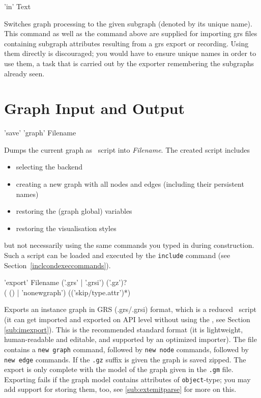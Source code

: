 \begin{rail}
  'in' Text
\end{rail}
Switches graph processing to the given subgraph (denoted by its unique name).
This command as well as the command above are supplied for importing grs files containing subgraph attributes resulting from a grs export or recording.
Using them directly is discouraged; you would have to ensure unique names in order to use them, a task that is carried out by the exporter remembering the subgraphs already seen.


\section{Graph Input and Output}
\label{outputcmds}

\begin{rail}
  'save' 'graph' Filename
\end{rail}
Dumps the current graph as \GrShell\ script into \emph{Filename}.
The created script includes
\begin{itemize}
  \item selecting the backend
  \item creating a new graph with all nodes and edges (including their persistent names)
  \item restoring the (graph global) variables
  \item restoring the visualisation styles
\end{itemize}
but not necessarily using the same commands you typed in during construction.
Such a script can be loaded and executed by the \texttt{include} command (see Section~\ref{inclcondexeccommands}).

\begin{rail}
  'export' Filename ('.grs' | '.grsi') ('.gz')? \\ ( () | 'nonewgraph') (('skip/type.attr')*)
\end{rail}
Exports an instance graph in GRS (.grs/.grsi) format, which is a reduced \GrShell\ script
(it can get imported and exported on API level without using the \GrShell, see Section \ref{sub:imexport}).
This is the recommended standard format (it is lightweight, human-readable and editable, and supported by an optimized importer).
The file contains a \texttt{new graph} command, followed by \texttt{new node} commands, followed by \texttt{new edge} commands.
If the \texttt{.gz} suffix is given the graph is saved zipped.
The export is only complete with the model of the graph given in the \texttt{.gm} file.
Exporting fails if the graph model contains attributes of \texttt{object}-type; you may add support for storing them, too, see \ref{sub:extemitparse} for more on this.

